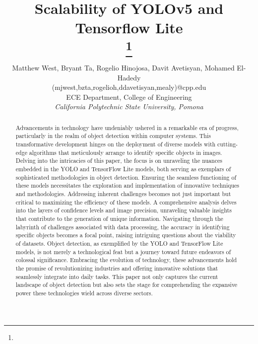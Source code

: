 \documentclass[conference]{IEEEtran}
\begin{document}
\title{
Scalability of YOLOv5 and Tensorflow Lite\\
{\footnotesize \textsuperscript{}}
\thanks{}
}

\author{Matthew West, Bryant Ta, Rogelio Hinojosa, Davit Avetisyan, Mohamed El-Hadedy\\(mjwest,bzta,rogelioh,ddavetisyan,mealy)@cpp.edu\\
ECE Department, College of Engineering\\
\textit{California Polytechnic State University, Pomona}}


\maketitle

\begin{abstract}

Advancements in technology have undeniably ushered in a remarkable era of progress, particularly in the realm of object detection within computer systems. This transformative development hinges on the deployment of diverse models with cutting-edge algorithms that meticulously arrange to identify specific objects in images. Delving into the intricacies of this paper, the focus is on unraveling the nuances embedded in the YOLO and TensorFlow Lite models, both serving as exemplars of sophisticated methodologies in object detection. Ensuring the seamless functioning of these models necessitates the exploration and implementation of innovative techniques and methodologies. Addressing inherent challenges becomes not just important but critical to maximizing the efficiency of these models. A comprehensive analysis delves into the layers of confidence levels and image precision, unraveling valuable insights that contribute to the generation of unique information. Navigating through the labyrinth of challenges associated with data processing, the accuracy in identifying specific objects becomes a focal point, raising intriguing questions about the viability of datasets. Object detection, as exemplified by the YOLO and TensorFlow Lite models, is not merely a technological feat but a journey toward future endeavors of colossal significance. Embracing the evolution of technology, these advancements hold the promise of revolutionizing industries and offering innovative solutions that seamlessly integrate into daily tasks. This paper not only captures the current landscape of object detection but also sets the stage for comprehending the expansive power these technologies wield across diverse sectors.
     
\end{abstract}
\end{document}
